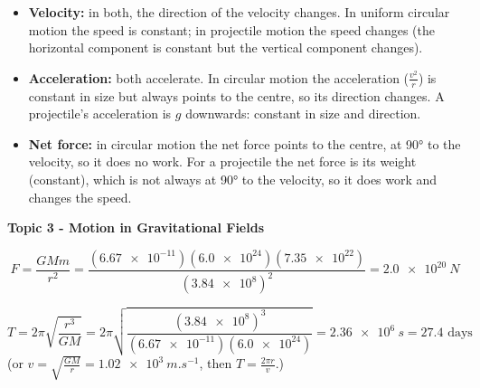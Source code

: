 \documentclass[12pt]{article}
\newcommand\anstopic[1]{\par\Needspace{8\baselineskip}\vspace{4mm}%
  \begin{center}{\headfont\bfseries\fontsize{14}{18}\selectfont #1\par}\end{center}\vspace{2pt}}
\begin{document}
\ansq
\begin{crit}
\end{crit}
\sample
\begin{itemize}
  \item \textbf{Velocity:} in both, the direction of the velocity changes. In uniform circular motion
        the speed is constant; in projectile motion the speed changes (the horizontal component is
        constant but the vertical component changes).
  \item \textbf{Acceleration:} both accelerate. In circular motion the acceleration ($\frac{v^2}{r}$)
        is constant in size but always points to the centre, so its direction changes. A projectile's
        acceleration is $g$ downwards: constant in size and direction.
  \item \textbf{Net force:} in circular motion the net force points to the centre, at \ang{90} to the
        velocity, so it does no work. For a projectile the net force is its weight (constant), which
        is not always at \ang{90} to the velocity, so it does work and changes the speed.
\end{itemize}

\anstopic{Topic 3 - Motion in Gravitational Fields}

\ansq
{}
\begin{crit}
\end{crit}
\sample
\[ F = \frac{GMm}{r^2} = \frac{(\num{6.67e-11})(\num{6.0e24})(\num{7.35e22})}{(\num{3.84e8})^2} = \qty{2.0e20}{N} \]
\begin{crit}
\end{crit}
\sample
\[ T = 2\pi\sqrt{\frac{r^3}{GM}} = 2\pi\sqrt{\frac{(\num{3.84e8})^3}{(\num{6.67e-11})(\num{6.0e24})}}
     = \qty{2.36e6}{s} = 27.4 \text{ days} \]
(or $v = \sqrt{\frac{GM}{r}} = \qty{1.02e3}{m.s^{-1}}$, then $T = \frac{2\pi r}{v}$.)
\end{document}
